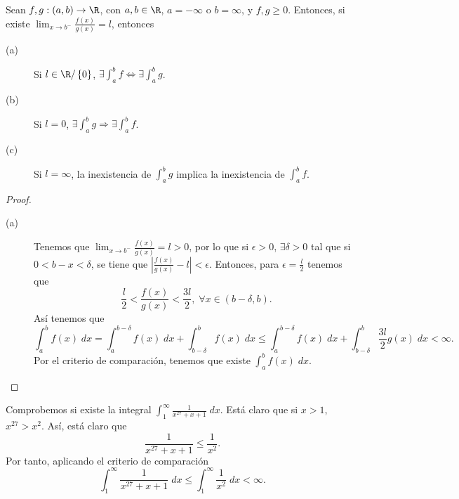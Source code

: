 \begin{ftheorem}
\normalfont Sean $\displaystyle f,g : (a,b) \to \R $, con $\displaystyle a,b \in \R $, $\displaystyle a = - \infty $ o $\displaystyle b = \infty $, y $\displaystyle f,g \geq 0 $. Entonces, si existe $\displaystyle \lim_{x \to b^{-}}\frac{f\left(x\right)}{g\left(x\right)} = l $, entonces
\begin{description}
	\item[(a)] Si $\displaystyle l \in \R/ \left\{ 0\right\}  $, $\displaystyle \exists \int^{b}_{a} f \iff \exists \int^{b}_{a} g $. 
\item[(b)] Si $\displaystyle l = 0 $, $\displaystyle \exists \int^{b}_{a} g \Rightarrow \exists \int^{b}_{a} f  $. 
\item[(c)] Si $\displaystyle l = \infty $, la inexistencia de $\displaystyle \int^{b}_{a} g $ implica la inexistencia de $\displaystyle \int^{b}_{a} f $.
\end{description}
\end{ftheorem}
\begin{proof}
\begin{description}
\item[(a)] Tenemos que $\displaystyle \lim_{x \to b^{-}}\frac{f\left(x\right)}{g\left(x\right)} = l > 0 $, por lo que si $\displaystyle \epsilon > 0 $, $\displaystyle \exists \delta > 0 $ tal que si $\displaystyle 0 < b - x < \delta  $, se tiene que $\displaystyle \left|\frac{f\left(x\right)}{g\left(x\right)}-l\right|<\epsilon$. Entonces, para $\displaystyle \epsilon = \frac{l}{2} $ tenemos que
	\[ \frac{l}{2} < \frac{f\left(x\right)}{g\left(x\right)} < \frac{3l}{2}, \; \forall x \in \left(b-\delta, b\right) .\]
	Así tenemos que
	\[\int^{b}_{a} f\left(x\right) \; dx = \int^{b- \delta}_{a} f\left(x\right) \; dx + \int^{b}_{b-\delta } f\left(x\right) \; dx \leq \int^{b-\delta }_{a} f\left(x\right) \; dx + \int^{b}_{b-\delta } \frac{3l}{2}g\left(x\right) \; dx < \infty.\]
Por el criterio de comparación, tenemos que existe $\displaystyle \int^{b}_{a} f\left(x\right) \; dx $.	
\end{description}
\end{proof}
\begin{eg}
\normalfont Comprobemos si existe la integral $\displaystyle \int^{\infty}_{1} \frac{1}{x^{27}+x+1} \; dx $. Está claro que si $\displaystyle x > 1 $, $\displaystyle x^{27} > x^{2} $. Así, está claro que
\[ \frac{1}{x^{27}+x+1} \leq \frac{1}{x^{2}} .\]
Por tanto, aplicando el criterio de comparación
\[ \int^{\infty}_{1} \frac{1}{x^{27}+x+1} \; dx \leq \int^{\infty}_{1} \frac{1}{x^{2}} \; dx < \infty .\]
\end{eg}

